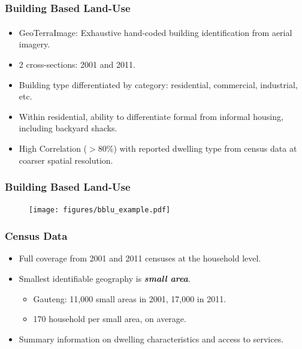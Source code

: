\documentclass[aspectratio=32]{beamer}
\begin{document}
\begin{frame}
\frametitle{Building Based Land-Use}

\begin{itemize}

  \item GeoTerraImage\textsuperscript{\tiny\textcopyright}: Exhaustive hand-coded building identification  from aerial imagery.
  \vspace{2mm}
  \item 2 cross-sections: 2001 and 2011. 
  \vspace{2mm}
  \item Building type differentiated by category: residential, commercial, industrial, etc.
  \vspace{2mm}
  \item Within residential, ability to differentiate formal from informal housing, including backyard shacks.
  \vspace{2mm}
  \item High Correlation ($>$80\%) with reported dwelling type from census data at coarser spatial resolution.
\end{itemize}
\end{frame}


\begin{frame}
\frametitle{Building Based Land-Use}

\begin{figure}
 \texttt{[image: figures/bblu\_example.pdf]} 
\end{figure}
\end{frame}


\begin{frame}
\frametitle{Census Data}
\begin{itemize}
  \item Full coverage from 2001 and 2011 censuses at the household level.
  \vspace{.1mm}
  \item Smallest identifiable geography is {\it\bf small area}.
  \begin{itemize}
  \item Gauteng: 11,000 small areas in 2001, 17,000 in 2011.
  \item 170 household per small area, on average.
  \end{itemize}
  \vspace{.5mm}
  \item Summary information on dwelling characteristics and access to services.
\end{itemize}
\end{frame}
\end{document}
